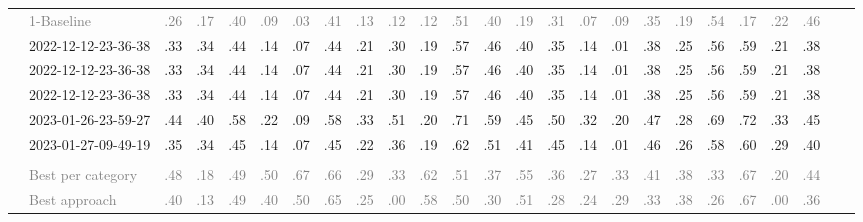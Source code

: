 \begin{table*}
\begin{tabular}{@{}ll@{\hspace{10pt}}c@{\hspace{5pt}}cccccccccccccccccccccc@{}}
& \textcolor{gray}{1-Baseline} & \textcolor{gray}{.26} & \textcolor{gray}{.17} & \textcolor{gray}{.40} & \textcolor{gray}{.09} & \textcolor{gray}{.03} & \textcolor{gray}{.41} & \textcolor{gray}{.13} & \textcolor{gray}{.12} & \textcolor{gray}{.12} & \textcolor{gray}{.51} & \textcolor{gray}{.40} & \textcolor{gray}{.19} & \textcolor{gray}{.31} & \textcolor{gray}{.07} & \textcolor{gray}{.09} & \textcolor{gray}{.35} & \textcolor{gray}{.19} & \textcolor{gray}{.54} & \textcolor{gray}{.17} & \textcolor{gray}{.22} & \textcolor{gray}{.46} \\
& 2022-12-12-23-36-38 & .33 & .34 & .44 & .14 & .07 & .44 & .21 & .30 & .19 & .57 & .46 & .40 & .35 & .14 & .01 & .38 & .25 & .56 & .59 & .21 & .38 \\
& 2022-12-12-23-36-38 & .33 & .34 & .44 & .14 & .07 & .44 & .21 & .30 & .19 & .57 & .46 & .40 & .35 & .14 & .01 & .38 & .25 & .56 & .59 & .21 & .38 \\
& 2022-12-12-23-36-38 & .33 & .34 & .44 & .14 & .07 & .44 & .21 & .30 & .19 & .57 & .46 & .40 & .35 & .14 & .01 & .38 & .25 & .56 & .59 & .21 & .38 \\
& 2023-01-26-23-59-27 & .44 & .40 & .58 & .22 & .09 & .58 & .33 & .51 & .20 & .71 & .59 & .45 & .50 & .32 & .20 & .47 & .28 & .69 & .72 & .33 & .45 \\
& 2023-01-27-09-49-19 & .35 & .34 & .45 & .14 & .07 & .45 & .22 & .36 & .19 & .62 & .51 & .41 & .45 & .14 & .01 & .46 & .26 & .58 & .60 & .29 & .40 \\
\addlinespace
\multicolumn{2}{@{}l}{\emph{Nahj al-Balagha}} \\
& \textcolor{gray}{Best per category} & \textcolor{gray}{.48} & \textcolor{gray}{.18} & \textcolor{gray}{.49} & \textcolor{gray}{.50} & \textcolor{gray}{.67} & \textcolor{gray}{.66} & \textcolor{gray}{.29} & \textcolor{gray}{.33} & \textcolor{gray}{.62} & \textcolor{gray}{.51} & \textcolor{gray}{.37} & \textcolor{gray}{.55} & \textcolor{gray}{.36} & \textcolor{gray}{.27} & \textcolor{gray}{.33} & \textcolor{gray}{.41} & \textcolor{gray}{.38} & \textcolor{gray}{.33} & \textcolor{gray}{.67} & \textcolor{gray}{.20} & \textcolor{gray}{.44} \\
& \textcolor{gray}{Best approach} & \textcolor{gray}{.40} & \textcolor{gray}{.13} & \textcolor{gray}{.49} & \textcolor{gray}{.40} & \textcolor{gray}{.50} & \textcolor{gray}{.65} & \textcolor{gray}{.25} & \textcolor{gray}{.00} & \textcolor{gray}{.58} & \textcolor{gray}{.50} & \textcolor{gray}{.30} & \textcolor{gray}{.51} & \textcolor{gray}{.28} & \textcolor{gray}{.24} & \textcolor{gray}{.29} & \textcolor{gray}{.33} & \textcolor{gray}{.38} & \textcolor{gray}{.26} & \textcolor{gray}{.67} & \textcolor{gray}{.00} & \textcolor{gray}{.36} \\

\end{tabular}
\end{table*}
